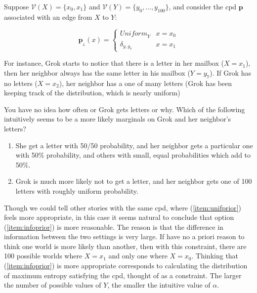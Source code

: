 \documentclass[letterpaper]{article} %
\theoremstyle{plain}
\theoremstyle{definition}
\theoremstyle{remark}
\newcommand\mat[1]{\mathbf{#1}}
\newcommand{\bp}[1][L]{\mat{p}_{\!_{#1}\!}}
\newcommand{\V}{\mathcal V}
\begin{document}
{	\begin{example}\label{ex:alpha-motivation}
		Suppose $\V(X) = \{x_0, x_1\}$ and $\V(Y) = \{y_0,
                \ldots, y_{100}\}$, and consider the cpd $\mat p$
                associated with an edge from $X$ to $Y$: 
		
		\begin{equation}
			\bp(x) = \begin{cases}
				\mathit{Uniform}_Y & x = x_0 \\
				\delta_{y, y_7} & x = x_1
			\end{cases}
		\end{equation}

		For instance, Grok starts to notice that there is a letter in her mailbox ($X = x_1$), then her neighbor always has the same letter in his mailbox ($Y = y_7$). If Grok has no letters ($X = x_2$), her neighbor has a one of many letters (Grok has been keeping track of the distribution, which is nearly uniform)
		
		You have no idea how often or Grok gets letters or why. Which of the following intuitively seems to be a more likely marginals on Grok and her neighbor's letters?
		
		\begin{enumerate}
			\item She get a letter with 50/50 probability, and her neighbor gets a particular one with 50\% probability, and others with small, equal probabilities which add to 50\%. \label{item:unifprior}
			\item Grok is much more likely not to get a letter, and her neighbor gets one of 100 letters with roughly uniform probability. \label{item:infoprior}
		\end{enumerate}
		 	
				
		Though we could tell other stories with the same cpd,
                where (\ref{item:unifprior}) feels more appropriate,
                in this case it seems natural to conclude that option
                (\ref{item:infoprior}) is more reasonable. The reason
                is that the difference in information between the two
                settings is very large. If have no a priori reason to
                think one world is more likely than another, then with
                this constraint, there are 100 possible worlds where
                 $X = x_1$ and only one where $X = x_0$. Thinking that
                (\ref{item:infoprior}) is more appropriate corresponds
                to calculating the distribution of maximum entropy
                satisfying the cpd, thought of as a constraint. The
                larger the number of possible values of $Y$, the
                smaller the intuitive value of $\alpha$. 


\end{example}}
\end{document}
